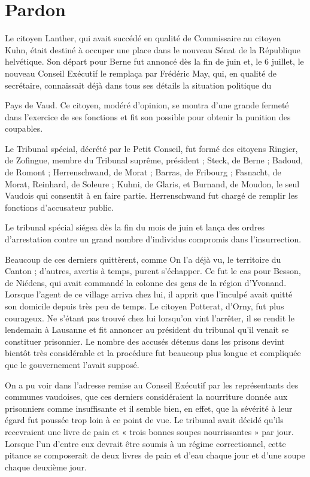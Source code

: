 \documentclass[french,twoside]{book} %
\begin{document}
\section[Pardon]{Pardon}
\noindent Le citoyen Lanther, qui avait succédé en qualité de Commissaire au citoyen Kuhn, était destiné à occuper une place dans le nouveau Sénat de la République helvétique. Son départ pour Berne fut annoncé dès la fin de juin et, le 6 juillet, le nouveau Conseil Exécutif le remplaça par Frédéric May, qui, en qualité de secrétaire, connaissait déjà dans tous ses détails la situation politique du\par
Pays de Vaud. Ce citoyen, modéré d’opinion, se montra d’une grande fermeté dans l’exercice de ses fonctions et fit son possible pour obtenir la punition des coupables.\par
Le Tribunal spécial, décrété par le Petit Conseil, fut formé des citoyens Ringier, de Zofingue, membre du Tribunal suprême, président ; Steck, de Berne ; Badoud, de Romont ; Herrenschwand, de Morat ; Barras, de Fribourg ; Fasnacht, de Morat, Reinhard, de Soleure ; Kuhni, de Glaris, et Burnand, de Moudon, le seul Vaudois qui consentit à en faire partie. Herrenschwand fut chargé de remplir les fonctions d’accusateur public.\par
Le tribunal spécial siégea dès la fin du mois de juin et lança des ordres d’arrestation contre un grand nombre d’individus compromis dans l’insurrection.\par
Beaucoup de ces derniers quittèrent, comme On l’a déjà vu, le territoire du Canton ; d’autres, avertis à temps, purent s’échapper. Ce fut le cas pour Besson, de Niédens, qui avait commandé la colonne des gens de la région d’Yvonand. Lorsque l’agent de ce village arriva chez lui, il apprit que l’inculpé avait quitté son domicile depuis très peu de temps. Le citoyen Potterat, d’Orny, fut plus courageux. Ne s’étant pas trouvé chez lui lorsqu’on vint l’arrêter, il se rendit le lendemain à Lausanne et fit annoncer au président du tribunal qu’il venait se constituer prisonnier. Le nombre des accusés détenus dans les prisons devint bientôt très considérable et la procédure fut beaucoup plus longue et compliquée que le gouvernement l’avait supposé.\par
On a pu voir dans l’adresse remise au Conseil Exécutif par les représentants des communes vaudoises, que ces derniers considéraient la nourriture donnée aux prisonniers comme insuffisante et il semble bien, en effet, que la sévérité à leur égard fut poussée trop loin à ce point de vue. Le tribunal avait décidé qu’ils recevraient une livre de pain et « trois bonnes soupes nourrissantes » par jour. Lorsque l’un d’entre eux devrait être soumis à un régime correctionnel, cette pitance se composerait de deux livres de pain et d’eau chaque jour et d’une soupe chaque deuxième jour.\par
\end{document}
